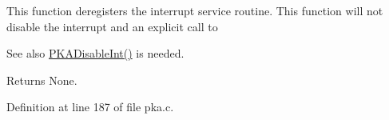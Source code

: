 This function deregisters the interrupt service routine. This function will not disable the interrupt and an explicit call to \begin{DoxySeeAlso}{See also}
\hyperlink{group__pka__driver_ga332c572585f555dc982817a355284f70}{P\+K\+A\+Disable\+Int()} is needed.
\end{DoxySeeAlso}
\begin{DoxyReturn}{Returns}
None. 
\end{DoxyReturn}


Definition at line 187 of file pka.\+c.

